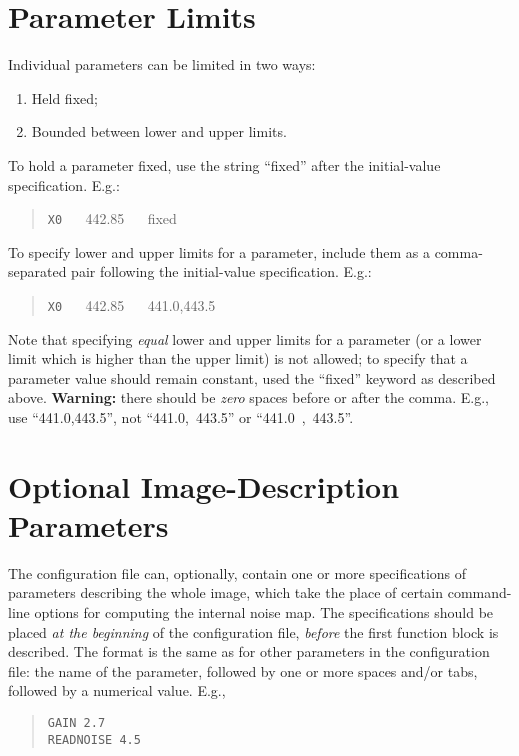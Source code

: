 \documentclass[10pt,a4paper,article]{memoir}
\begin{document}
\section{Parameter Limits}\label{sec:param-limits}

Individual parameters can be limited in two ways:
\begin{enumerate}
\item Held fixed;
\item Bounded between lower and upper limits.
\end{enumerate}
To hold a parameter fixed, use the string ``fixed'' after the initial-value
specification. E.g.:
\begin{quote}
\texttt{X0} ~~ 442.85 ~~ fixed
\end{quote}
To specify lower and upper limits for a parameter, include them as a comma-separated
pair following the initial-value specification. E.g.:
\begin{quote}
\texttt{X0} ~~ 442.85 ~~ 441.0,443.5
\end{quote}
Note that specifying \textit{equal} lower and upper limits for a parameter (or a lower limit
which is higher than the upper limit) is not allowed; to specify that a parameter
value should remain constant, used the ``fixed'' keyword as described above.
\textbf{Warning:} there should be \textit{zero} spaces before or after the comma. E.g., use ``441.0,443.5'',
not ``441.0,~443.5'' or ``441.0~,~443.5''.


\section{Optional Image-Description Parameters}

The configuration file can, optionally, contain one or more specifications of 
parameters describing the whole image, which take the place of certain command-line
options for computing the internal noise map.  The specifications should be placed
\textit{at the beginning} of the configuration file, \textit{before} the first function
block is described. The format is the same as for other parameters in the configuration
file: the name of the parameter, followed by one or more spaces and/or tabs, followed
by a numerical value. E.g.,
\begin{quote}
  \texttt{GAIN  2.7} \\
  \texttt{READNOISE  4.5} \\
\end{quote}
\end{document}
